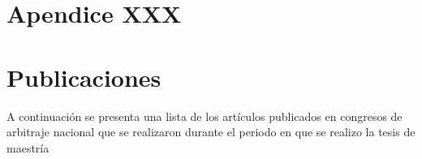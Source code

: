 \appendix

\chapter{Apendice XXX \label{Apen:A}}



\chapter{Publicaciones \label{ApenD}}
A continuación se presenta una lista de los artículos publicados en congresos de arbitraje nacional que se realizaron durante el periodo en que se realizo la tesis de maestría


